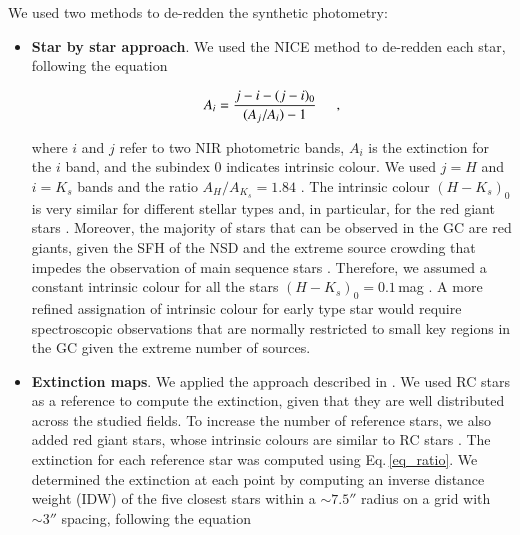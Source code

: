\documentclass{aa}
\begin{document}
We used two methods to de-redden the synthetic photometry:

\begin{itemize}

\item {\bf Star by star approach}. We used the NICE method \citep[e.g.][]{Lada:1994uq,Lombardi:2001fk} to de-redden each star, following the equation


\begin{equation}
\label{eq_ratio}
 A_{i} = \frac{j-i-(j-{i})_0}{(A_j/A_{i})-1}\hspace{0.5cm} ,
\end{equation}


\noindent where $i$ and $j$ refer to two NIR photometric bands, $A_{i}$ is the extinction for the $i$ band, and the subindex 0 indicates intrinsic colour. We used $j = H$ and $i = K_s$ bands and the ratio $A_H/A_{K_s}=1.84$ \citep{Nogueras-Lara:2020aa}.  The intrinsic colour $(H-K_s)_0$ is very similar for different stellar types and, in particular, for the red giant stars \citep[see Fig. 29 in ][]{Nogueras-Lara:2018aa}. Moreover, the majority of stars that can be observed in the GC are red giants, given the SFH of the NSD and the extreme source crowding that impedes the observation of main sequence stars \citep[e.g.][]{Nogueras-Lara:2019ad, Nogueras-Lara:2021uq}. Therefore, we assumed a constant intrinsic colour for all the stars $(H-K_s)_0=0.1$\,mag \citep[see Fig. 29 in ][]{Nogueras-Lara:2018aa}. A more refined assignation of intrinsic colour for early type star would require spectroscopic observations that are normally restricted to small key regions in the GC given the extreme number of sources.\\


\item {\bf Extinction maps}. We applied the approach described in \citet{Nogueras-Lara:2018aa, Nogueras-Lara:2018ab, Nogueras-Lara:2019ad}.  We used RC stars as a reference to compute the extinction, given that they are well distributed across the studied fields. To increase the number of reference stars, we also added red giant stars, whose intrinsic colours are similar to RC stars \citep[see Figs. 33 and 34 of][]{Nogueras-Lara:2018aa}. The extinction for each reference star was computed using Eq.\,\ref{eq_ratio}. We determined the extinction at each point by computing an inverse distance weight (IDW) of the five closest stars within a $\sim7.5''$ radius on a grid with $\sim3''$ spacing, following the equation


\end{itemize}
\end{document}
